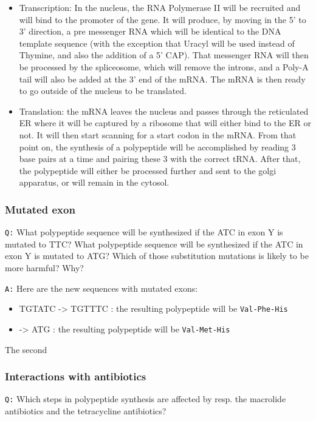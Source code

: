 \documentclass[11pt, a4paper,titlepage]{article}
\begin{document}
\begin{itemize}
\item Transcription: In the nucleus, the RNA Polymerase II will be
  recruited and will bind to the promoter of the gene. It will
  produce, by moving in the 5' to 3' direction, a pre messenger RNA
  which will be identical to the DNA template sequence (with the
  exception that Uracyl will be used instead of Thymine, and also the
  addition of a 5' CAP). That messenger RNA will then be processed by
  the spliceosome, which will remove the introns, and a Poly-A tail
  will also be added at the 3' end of the mRNA. The mRNA is then
  ready to go outside of the nucleus to be translated.
\item Translation: the mRNA leaves the nucleus and passes through the
  reticulated ER where it will be captured by a ribosome that will
  either bind to the ER or not. It will then start scanning for a
  start codon in the mRNA. From that point on, the synthesis of a
  polypeptide will be accomplished by reading 3 base pairs at a time
  and pairing these 3 with the correct tRNA. After that, the
  polypeptide will either be processed further and sent to the golgi
  apparatus, or will remain in the cytosol.
\end{itemize}
\subsubsection{Mutated exon}
\label{sec-1-2-3}

\texttt{Q:} What polypeptide sequence will be synthesized if the ATC in exon
Y is mutated to TTC? What polypeptide sequence will be synthesized if
the ATC in exon Y is mutated to ATG? Which of those substitution
mutations is likely to be more harmful? Why?

\texttt{A:} Here are the new sequences with mutated exons:

\begin{itemize}
\item TGTATC -> TGTTTC : the resulting polypeptide will be \texttt{Val-Phe-His}
\item -> ATG : the resulting polypeptide will be \texttt{Val-Met-His}
\end{itemize}

The second
\subsubsection{Interactions with antibiotics}
\label{sec-1-2-4}

\texttt{Q:} Which steps in polypeptide synthesis are affected by resp. the
macrolide antibiotics and the tetracycline antibiotics?
\end{document}

